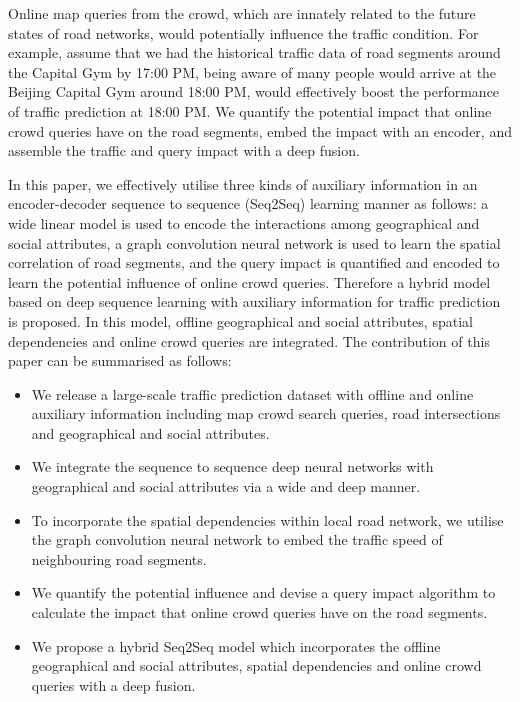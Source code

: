 Online map queries from the crowd, which are innately related to the future states of road networks, would potentially influence the traffic condition. For example, assume that we had the historical traffic data of road segments around the Capital Gym by 17:00 PM, being aware of many people would arrive at the Beijing Capital Gym around 18:00 PM, would effectively boost the performance of traffic prediction at 18:00 PM. We quantify the potential impact that online crowd queries have on the road segments, embed the impact with an encoder, and assemble the traffic and query impact with a deep fusion.

In this paper, we effectively utilise three kinds of auxiliary information in an encoder-decoder sequence to sequence (Seq2Seq) \cite{cho2014learning,sutskever2014sequence} learning manner as follows: a wide linear model is used to encode the interactions among geographical and social attributes, a graph convolution neural network is used to learn the spatial correlation of road segments, and the query impact is quantified and encoded to learn the potential influence of online crowd queries. Therefore a hybrid model based on deep sequence learning with auxiliary information for traffic prediction is proposed. In this model, offline geographical and social attributes, spatial dependencies and online crowd queries are integrated. The contribution of this paper can be summarised as follows:
\begin{itemize}
\item We release a large-scale traffic prediction dataset with offline and online auxiliary information including map crowd search queries, road intersections and geographical and social attributes.
\item We integrate the sequence to sequence deep neural networks with geographical and social attributes via a wide and deep manner.
\item To incorporate the spatial dependencies within local road network, we utilise the graph convolution neural network to embed the traffic speed of neighbouring road segments.
\item We quantify the potential influence and devise a query impact algorithm to calculate the impact that online crowd queries have on the road segments. 
\item We propose a hybrid Seq2Seq model which incorporates the offline geographical and social attributes, spatial dependencies and online crowd queries with a deep fusion.
\end{itemize}

